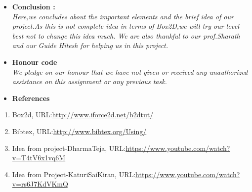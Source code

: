 \documentclass[a4paper]{article}
\begin{document}
\begin{flushleft}
\begin{itemize}
	\item{\LARGE \textbf{Conclusion :}}\\
	\vspace{2mm}
	\large\textit{
	Here,we concludes about the important elements and the brief idea of our project.As this is not complete idea in terms of Box2D,we will try our level best not to change this idea much. We are also thankful to our prof.Sharath and our Guide Hitesh for helping us in this project.
	}
		\item{\LARGE \textbf{Honour code}}\\
		\large\textit{
		We pledge on our honour that we have not given or received any unauthorized assistance on this assignment or any previous task.
		}

		\end{itemize}
		
		\vspace{5pt}
		\begin{itemize}
		\item{\LARGE \textbf{References}}\\
		\end{itemize}
		\begin{enumerate}
		\item{Box2d, URL:{\url{http://www.iforce2d.net/b2dtut/}}}
		
		\item{Bibtex, URL:{\url{http://www.bibtex.org/Using/}}}
		\item{Idea from project-DharmaTeja, URL:{\url{https://www.youtube.com/watch?v=T4tV6x1vq6M}}}
		\item{Idea from Project-KaturiSaiKiran, URL:{\url{https://www.youtube.com/watch?v=rs6J7KdVKmQ}}}
		\end{enumerate}
		\end{flushleft}
		
		
	
	
	
	
	
\end{document}
